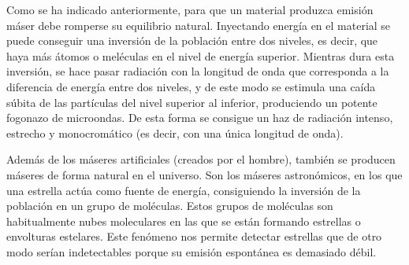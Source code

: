 Como se ha indicado anteriormente, para que un material produzca emisi\'on m\'aser debe romperse su equilibrio natural. Inyectando energ\'ia en el material se puede conseguir una inversi\'on de la poblaci\'on entre dos niveles, es decir, que haya m\'as \'atomos o mel\'eculas en el nivel de energ\'ia superior. Mientras dura esta inversi\'on, se hace pasar radiaci\'on con la longitud de onda que corresponda a la diferencia de energ\'ia entre dos niveles, y de este modo se estimula una ca\'ida s\'ubita de las part\'iculas del nivel superior al inferior, produciendo un potente fogonazo de microondas. De esta forma se consigue un haz de radiaci\'on intenso, estrecho y monocrom\'atico (es decir, con una \'unica longitud de onda). 

Adem\'as de los m\'aseres artificiales (creados por el hombre), tambi\'en se producen m\'aseres de forma natural en el universo. Son los m\'aseres astron\'omicos, en los que una estrella act\'ua como fuente de energ\'ia, consiguiendo la inversi\'on de la poblaci\'on en un grupo de mol\'eculas. Estos grupos de mol\'eculas son habitualmente nubes moleculares en las que se est\'an formando estrellas o envolturas estelares. Este fen\'omeno nos permite detectar estrellas que de otro modo ser\'ian indetectables porque su emisi\'on espont\'anea es demasiado d\'ebil.
